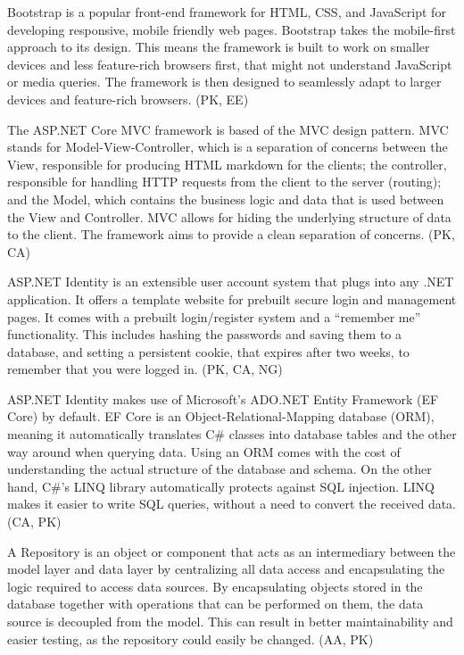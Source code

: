 \documentclass[acmlarge, review=false, screen=true]{acmart}
\begin{document}
Bootstrap is a popular front-end framework for HTML, CSS, and JavaScript for developing responsive, mobile friendly web pages\cite{bootstrap}. Bootstrap takes the mobile-first approach to its design\cite{responsive-web-design}. This means the framework is built to work on smaller devices and less feature-rich browsers first, that might not understand JavaScript or media queries. The framework is then designed to seamlessly adapt to larger devices and feature-rich browsers. (PK, EE)

The ASP.NET Core MVC framework is based of the MVC design pattern\cite{aspnet-mvc}. MVC stands for Model-View-Controller, which is a separation of concerns between the View, responsible for producing HTML markdown for the clients; the controller, responsible for handling HTTP requests from the client to the server (routing); and the Model, which contains the business logic and data that is used between the View and Controller. MVC allows for hiding the underlying structure of data to the client. The framework aims to provide a clean separation of concerns. (PK, CA)

ASP.NET Identity is an extensible user account system that plugs into any .NET application\cite{aspnet-identity}. It offers a template website for prebuilt secure login and management pages. It comes with a prebuilt login/register system and a “remember me” functionality. This includes hashing the passwords and saving them to a database, and setting a persistent cookie, that expires after two weeks, to remember that you were logged in. (PK, CA, NG)

ASP.NET Identity makes use of Microsoft’s ADO.NET Entity Framework (EF Core) by default\cite{adodotnet}. EF Core is an Object-Relational-Mapping database (ORM), meaning it automatically translates C\# classes into database tables and the other way around when querying data. Using an ORM comes with the cost of understanding the actual structure of the database and schema\cite{orm}. On the other hand, C\#’s LINQ library automatically protects against SQL injection\cite{ef-linq}. LINQ makes it easier to write SQL queries, without a need to convert the received data. (CA, PK)

A Repository is an object or component that acts as an intermediary between the model layer and data layer by centralizing all data access and encapsulating the logic required to access data sources\cite{Repository-pattern}. By encapsulating objects stored in the database together with operations that can be performed on them, the data source is decoupled from the model. This can result in better maintainability and easier testing, as the repository could easily be changed. (AA, PK)
\end{document}
